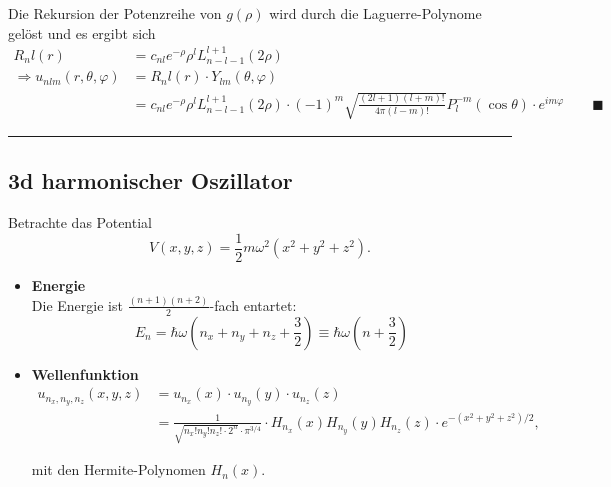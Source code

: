 \documentclass{article}
\newcommand{\lr}[1]{\left(#1\right)}
\begin{document}
{	Die Rekursion der Potenzreihe von $g(\rho)$ wird durch die Laguerre-Polynome gelöst und es ergibt sich
		\begin{align*}
			R_nl(r) &= c_{nl} e^{-\rho} \rho^l L_{n-l-1}^{l+1}(2\rho)\\
			\Rightarrow u_{nlm}(r,\theta,\varphi) &= R_nl(r) \cdot Y_{lm}(\theta,\varphi)\\
			&= c_{nl} e^{-\rho} \rho^l L_{n-l-1}^{l+1}(2\rho) \cdot (-1)^m \sqrt{\frac{(2l + 1)(l + m)!}{4\pi (l-m)!}} P_l^{-m}(\cos\theta) \cdot e^{im\varphi} \qquad\blacksquare
		\end{align*}

\hrule
}


\newpage


\subsection{3d harmonischer Oszillator}
Betrachte das Potential
	\begin{equation}
		V(x,y,z) = \frac{1}{2}m\omega^2 (x^2 + y^2 + z^2).
	\end{equation}


	\begin{itemize}
		\item \textbf{Energie}\\
		Die Energie ist $\frac{(n+1)(n+2)}{2}$-fach entartet:
			\begin{equation}
				E_n = \hbar\omega \lr{n_x + n_y + n_z + \frac{3}{2}} \equiv \hbar\omega \lr{n + \frac{3}{2}}
			\end{equation}


		\item \textbf{Wellenfunktion}
			\begin{align}
				u_{n_x,n_y,n_z}(x,y,z) &= u_{n_x}(x) \cdot u_{n_y}(y) \cdot u_{n_z}(z) \\
				&= \frac{1}{\sqrt{n_x! n_y! n_z! \cdot 2^{n}} \cdot \pi^{3/4}} \cdot H_{n_x}(x) H_{n_y}(y) H_{n_z}(z) \cdot e^{-(x^2+y^2+z^2)/2},
			\end{align}
		
		mit den Hermite-Polynomen $H_n(x)$.
	\end{itemize}


\newpage
\end{document}
